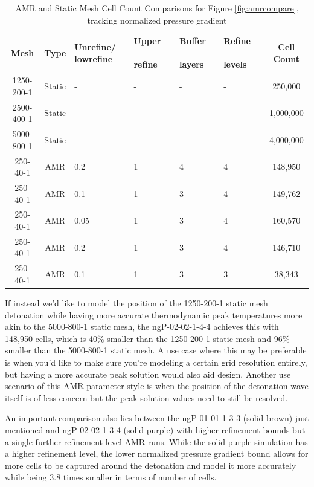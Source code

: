 \begin{table}[t]
\centering
\caption{AMR and Static Mesh Cell Count Comparisons for Figure \ref{fig:amrcompare}, tracking normalized pressure gradient}
\label{tab:amrcompare}
\begin{tabular}{ccp{2cm}p{2cm}p{2cm}p{2cm}c}
Mesh & Type & Unrefine/ lowrefine & Upper ~~~ refine & Buffer ~~ layers & Refine ~~ levels& Cell Count \\ \hline
1250-200-1 & Static & - & - & - & - & 250,000 \\ 
2500-400-1 & Static & - & - & - & - & 1,000,000 \\
5000-800-1 & Static & - & - & - & - & 4,000,000 \\
250-40-1 & AMR & 0.2 & 1 & 4 & 4 & 148,950 \\
250-40-1 & AMR & 0.1 & 1 & 3 & 4 & 149,762 \\
250-40-1 & AMR & 0.05 & 1 & 3 & 4 & 160,570 \\ 
250-40-1 & AMR & 0.2 & 1 & 3 & 4 & 146,710 \\ 
250-40-1 & AMR & 0.1 & 1 & 3 & 3 & 38,343 \\ 
\end{tabular}
\end{table}

If instead we'd like to model the position of the 1250-200-1 static mesh detonation while having more accurate thermodynamic peak temperatures more akin to the 5000-800-1 static mesh, the ngP-02-02-1-4-4 achieves this with 148,950 cells, which is 40\% smaller than the 1250-200-1 static mesh and 96\% smaller than the 5000-800-1 static mesh. A use case where this may be preferable is when you'd like to make sure you're modeling a certain grid resolution entirely, but having a more accurate peak solution would also aid design. Another use scenario of this AMR parameter style is when the position of the detonation wave itself is of less concern but the peak solution values need to still be resolved. 

An important comparison also lies between the ngP-01-01-1-3-3 (solid brown) just mentioned and ngP-02-02-1-3-4 (solid purple) with higher refinement bounds but a single further refinement level AMR runs. While the solid purple simulation has a higher refinement level, the lower normalized pressure gradient bound allows for more cells to be captured around the detonation and model it more accurately while being 3.8 times smaller in terms of number of cells. 
